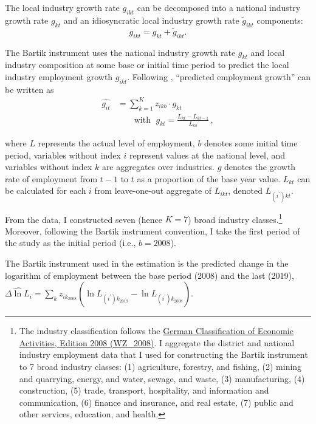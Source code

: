 \documentclass[
  12pt,
]{article}
\begin{document}
The local industry growth rate \(g_{ikt}\) can be decomposed into a
national industry growth rate \(g_{kt}\) and an idiosyncratic local
industry growth rate \(\widetilde{g}_{ikt}\) components:
\[g_{ikt} = g_{kt} + \widetilde{g}_{ikt}.\]

The Bartik instrument uses the national industry growth rate \(g_{kt}\)
and local industry composition at some base or initial time period to
predict the local industry employment growth \(g_{ikt}\). Following
\citet{bartik_1991}, ``predicted employment growth'' can be written as
\[
\begin{aligned}
\widehat{g_{it}} &=\sum_{k=1}^K z_{ikb}\cdot g_{kt}\\
&\quad\quad\text{with }\;g_{kt} = \frac{L_{kt} - L_{kt-1}}{L_{kb}}\,,
\end{aligned}
\]

where \(L\) represents the actual level of employment, \(b\) denotes
some initial time period, variables without index \(i\) represent values
at the national level, and variables without index \(k\) are aggregates
over industries. \(g\) denotes the growth rate of employment from
\(t-1\) to \(t\) as a proportion of the base year value. \(L_{kt}\) can
be calculated for each \(i\) from leave-one-out aggregate of
\(L_{ikt}\), denoted \(L_{(i^\prime)kt}\).

From the data, I constructed seven (hence \(K=7\)) broad industry
classes.\footnote{The industry classification follows the
  \href{https://www.destatis.de/DE/Methoden/Klassifikationen/Gueter-Wirtschaftsklassifikationen/klassifikation-wz-2008.html}{German
  Classification of Economic Activities, Edition 2008 (WZ\_2008)}. I
  aggregate the district and national industry employment data that I
  used for constructing the Bartik instrument to 7 broad industry
  classes: (1) agriculture, forestry, and fishing, (2) mining and
  quarrying, energy, and water, sewage, and waste, (3) manufacturing,
  (4) construction, (5) trade, transport, hospitality, and information
  and communication, (6) finance and insurance, and real estate, (7)
  public and other services, education, and health.} Moreover, following
the Bartik instrument convention, I take the first period of the study
as the initial period (i.e., \(b=2008\)).

The Bartik instrument used in the estimation is the predicted change in
the logarithm of employment between the base period (2008) and the last
(2019),
\(\widehat{\Delta\ln L_i} = \sum_k{z_{ik_{2008}} \left(\ln L_{(i^\prime)k_{2019}}-\ln L_{(i^\prime)k_{2008}}\right)}\).
\end{document}
